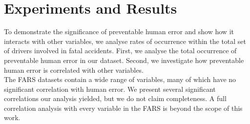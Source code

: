 \documentclass{article}
\theoremstyle{plain}
\theoremstyle{definition}
\theoremstyle{remark}
\begin{document}
\section{Experiments and Results}\label{sec:results}
To demonstrate the significance of preventable human error and show how it interacts with other variables, we analyse rates of occurrence within the total set of drivers involved in fatal accidents. First, we analyse the total occurrence of preventable human error in our dataset. Second, we investigate how preventable human error is correlated with other variables.
\\
The FARS datasets contain a wide range of variables, many of which have no significant correlation with human error. We present several significant correlations our analysis yielded, but we do not claim completeness. A full correlation analysis with every variable in the FARS is beyond the scope of this work.
\end{document}
